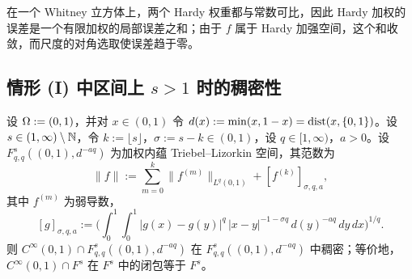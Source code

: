 \begin{remark}[直觉]
在一个 Whitney 立方体上，两个 Hardy 权重都与常数可比，因此 Hardy 加权的误差是一个有限加权的局部误差之和；由于 $f$ 属于 Hardy 加强空间，这个和收敛，而尺度的对角选取使误差趋于零。
\end{remark}

\subsection{情形 (I) 中区间上 \texorpdfstring{$s>1$}{s>1} 时的稠密性}

\begin{theorem}[情形 (I)：$s\in(1,\infty)\setminus\N$、$p=q$ 时区间上 $C^\infty$ 的稠密性]
设 $\Omega:=(0,1)$，并对 $x\in(0,1)$ 令 $d(x):=\min(x,1-x)=\operatorname{dist}(x,\{0,1\})$。设 $s\in(1,\infty)\setminus\N$，令 $k:=\lfloor s\rfloor$，$\sigma:=s-k\in(0,1)$，设 $q\in[1,\infty)$，$a>0$。设 $F^s_{q,q}((0,1),d^{-aq})$ 为加权内蕴 Triebel--Lizorkin 空间，其范数为
\[
  \|f\|:=\sum_{m=0}^{k}\|f^{(m)}\|_{L^q(0,1)}+[f^{(k)}]_{\sigma,q,a},
\]
其中 $f^{(m)}$ 为弱导数，
\[
  [g]_{\sigma,q,a}:=\Big(\int_0^1\int_0^1|g(x)-g(y)|^q\,|x-y|^{-1-\sigma q}\,d(y)^{-aq}\,dy\,dx\Big)^{1/q}.
\]
则 $C^\infty(0,1)\cap F^s_{q,q}((0,1),d^{-aq})$ 在 $F^s_{q,q}((0,1),d^{-aq})$ 中稠密；等价地，$C^\infty(0,1)\cap F^s$ 在 $F^s$ 中的闭包等于 $F^s$。
\end{theorem}

